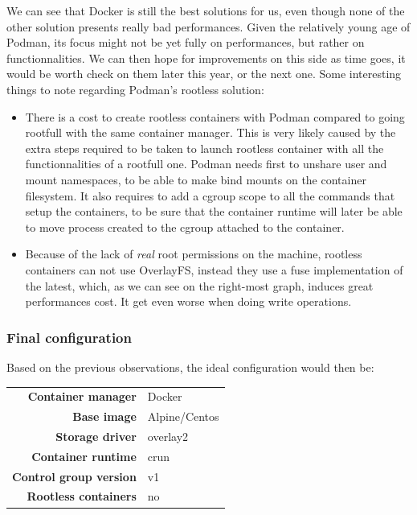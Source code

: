 We can see that Docker is still the best solutions for us, even though none of the other solution presents really bad performances.  Given the relatively young age of Podman, its focus might not be yet fully on performances, but rather on functionnalities.  We can then hope for improvements on this side as time goes, it would be worth check on them later this year, or the next one.  Some interesting things to note regarding Podman's rootless solution:
\begin{itemize}
  \item There is a cost to create rootless containers with Podman compared to going rootfull with the same container manager.  This is very likely caused by the extra steps required to be taken to launch rootless container with all the functionnalities of a rootfull one.  Podman needs first to unshare user and mount namespaces, to be able to make bind mounts on the container filesystem.  It also requires to add a cgroup scope to all the commands that setup the containers, to be sure that the container runtime will later be able to move process created to the cgroup attached to the container.
  \item Because of the lack of \textit{real} root permissions on the machine, rootless containers can not use OverlayFS, instead they use a fuse implementation of the latest, which, as we can see on the right-most graph, induces great performances cost.  It get even worse when doing write operations.
\end{itemize}

\subsubsection{Final configuration}

Based on the previous observations, the ideal configuration would then be:

\begin{center}
\begin{tabular}{rl}
  \textbf{Container manager} & Docker \\
  \textbf{Base image} & Alpine/Centos \\
  \textbf{Storage driver} & overlay2 \\
  \textbf{Container runtime} & crun \\
  \textbf{Control group version} & v1 \\
  \textbf{Rootless containers} & no \\
\end{tabular}
\end{center}

